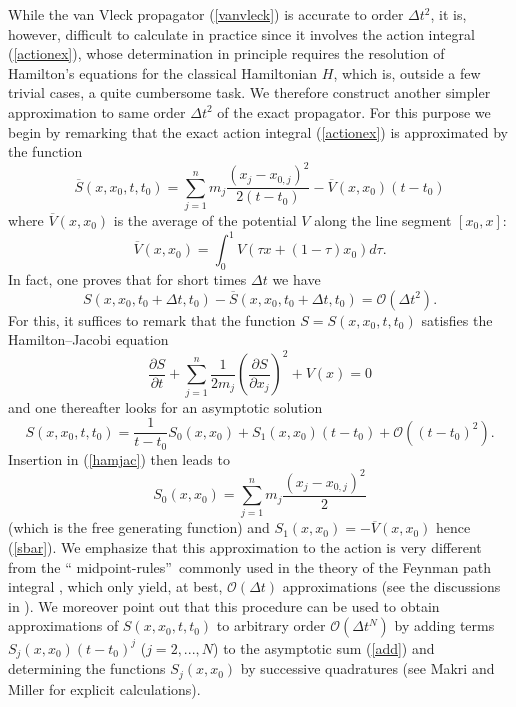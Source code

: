 \documentclass[12pt]{article}%
\begin{document}
While the van Vleck propagator (\ref{vanvleck}) is accurate to order $\Delta
t^{2}$, it is, however, difficult to calculate in practice since it involves
the action integral (\ref{actionex}), whose determination in principle
requires the resolution of Hamilton's equations for the classical Hamiltonian
$H$, which is, outside a few trivial cases, a quite cumbersome task. We
therefore construct another simpler approximation to same order $\Delta t^{2}$
of the exact propagator. For this purpose we begin by remarking that the exact
action integral (\ref{actionex}) is approximated by the function
\begin{equation}
\overline{S}(x,x_{0},t,t_{0})=\sum_{j=1}^{n}m_{j}\frac{(x_{j}-x_{0,j})^{2}%
}{2(t-t_{0})}-\overline{V}(x,x_{0})(t-t_{0}) \label{sbar}%
\end{equation}
where $\overline{V}(x,x_{0})$ is the average of the potential $V$ along the
line segment $[x_{0},x]:$
\begin{equation}
\overline{V}(x,x_{0})=\int_{0}^{1}V(\tau x+(1-\tau)x_{0})d\tau. \label{vbar}%
\end{equation}
In fact, one proves \cite{ICP,makmil1,makmil2} that for short times $\Delta t
$ we have
\begin{equation}
S(x,x_{0},t_{0}+\Delta t,t_{0})-\overline{S}(x,x_{0},t_{0}+\Delta
t,t_{0})=\mathcal{O}(\Delta t^{2}). \label{estimateICP}%
\end{equation}
For this, it suffices to remark that the function $S=S(x,x_{0},t,t_{0})$
satisfies the Hamilton--Jacobi equation%
\begin{equation}
\frac{\partial S}{\partial t}+\sum_{j=1}^{n}\frac{1}{2m_{j}}\left(
\frac{\partial S}{\partial x_{j}}\right)  ^{2}+V(x)=0 \label{hamjac}%
\end{equation}
and one thereafter looks for an asymptotic solution%
\begin{equation}
S(x,x_{0},t,t_{0})=\frac{1}{t-t_{0}}S_{0}(x,x_{0})+S_{1}(x,x_{0}%
)(t-t_{0})+\mathcal{O}((t-t_{0})^{2}). \label{add}%
\end{equation}
Insertion in (\ref{hamjac}) then leads to
\[
S_{0}(x,x_{0})=\sum_{j=1}^{n}m_{j}\frac{(x_{j}-x_{0,j})^{2}}{2}%
\]
(which is the free generating function) and $S_{1}(x,x_{0})=-\overline
{V}(x,x_{0})$ hence (\ref{sbar}). We emphasize that this approximation to the
action is very different from the \textquotedblleft
midpoint-rules\textquotedblright\ commonly used in the theory of the Feynman
path integral \cite{schulman}, which only yield, at best, $\mathcal{O}(\Delta
t)$ approximations (see the discussions in
\cite{ICP,gohi2,gohi3,makmil1,makmil2}). We moreover point out that this
procedure can be used to obtain approximations of $S(x,x_{0},t,t_{0})$ to
arbitrary order $\mathcal{O}(\Delta t^{N})$ by adding terms $S_{j}%
(x,x_{0})(t-t_{0})^{j}$ ($j=2,...,N$) to the asymptotic sum (\ref{add}) and
determining the functions $S_{j}(x,x_{0})$ by successive quadratures (see
Makri and Miller \cite{makmil1,makmil2} for explicit calculations).
\end{document}

